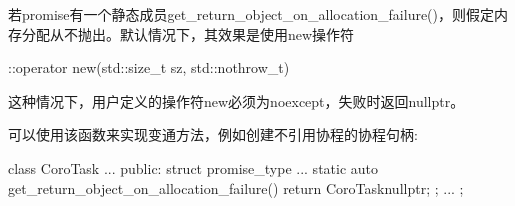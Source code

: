 若promise有一个静态成员get\_return\_object\_on\_allocation\_failure()，则假定内存分配从不抛出。默认情况下，其效果是使用new操作符

\begin{cpp}
::operator new(std::size_t sz, std::nothrow_t)
\end{cpp}

这种情况下，用户定义的操作符new必须为noexcept，失败时返回nullptr。

可以使用该函数来实现变通方法，例如创建不引用协程的协程句柄:

\begin{cpp}
class CoroTask {
	...
	public:
	struct promise_type {
		...
		static auto get_return_object_on_allocation_failure() {
			return CoroTask{nullptr};
		}
	};
	...
};
\end{cpp}





























